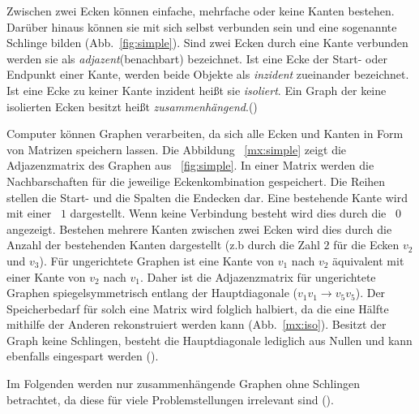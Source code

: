 Zwischen zwei Ecken können einfache, mehrfache oder keine Kanten bestehen.
Darüber hinaus können sie mit sich selbst verbunden sein und eine sogenannte Schlinge bilden (Abb.~\ref{fig:simple}).
Sind zwei Ecken durch eine Kante verbunden werden sie als \textit{adjazent}(benachbart) bezeichnet.
Ist eine Ecke der Start- oder Endpunkt einer Kante, werden beide Objekte als \textit{inzident} zueinander bezeichnet.
Ist eine Ecke zu keiner Kante inzident heißt sie \textit{isoliert}.
Ein Graph der keine isolierten Ecken besitzt heißt \textit{zusammenhängend}.(\cite[4\psq]{theory}) \par

Computer können Graphen verarbeiten, da sich alle Ecken und Kanten in Form von Matrizen speichern lassen.
Die Abbildung ~\ref{mx:simple} zeigt die Adjazenzmatrix des Graphen aus ~\ref{fig:simple}.
In einer Matrix werden die Nachbarschaften für die jeweilige Eckenkombination gespeichert.
Die Reihen stellen die Start- und die Spalten die Endecken dar.
Eine bestehende Kante wird mit einer ~$1$ dargestellt. Wenn keine Verbindung besteht wird dies durch die ~$0$ angezeigt.
Bestehen mehrere Kanten zwischen zwei Ecken wird dies durch die Anzahl der bestehenden Kanten dargestellt (z.b durch die Zahl $2$ für die Ecken $v_{2}$ und $v_{3}$).
Für ungerichtete Graphen ist eine Kante von $v_{1}$ nach $v_{2}$ äquivalent mit einer Kante von $v_{2}$ nach $v_{1}$.
Daher ist die Adjazenzmatrix für ungerichtete Graphen spiegelsymmetrisch entlang der Hauptdiagonale ($v_{1}v_{1} \rightarrow v_{5}v_{5}$).
Der Speicherbedarf für solch eine Matrix wird folglich halbiert, da die eine Hälfte mithilfe der Anderen rekonstruiert werden kann (Abb.~\ref{mx:iso}).
Besitzt der Graph keine Schlingen, besteht die Hauptdiagonale lediglich aus Nullen und kann ebenfalls eingespart werden (\cite[19]{algorithms}).

Im Folgenden werden nur zusammenhängende Graphen ohne Schlingen betrachtet, da diese für viele Problemstellungen irrelevant sind (\cite[4\psq]{theory}).

